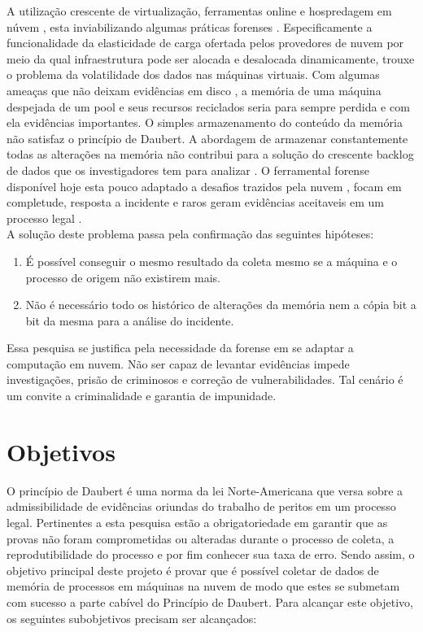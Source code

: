 \documentclass[12pt,				%
	openright,			%
	oneside,			%
	a4paper,			%
	english,			%
	brazil				%
	]{abntex2}
\begin{document}
A utilização crescente de virtualização, ferramentas online e hospredagem em núvem \cite{Amazon2016}, esta inviabilizando algumas práticas forenses \cite{Sharma2012}. 
Especificamente a funcionalidade da elasticidade de carga ofertada pelos provedores de nuvem por meio da qual infraestrutura pode ser alocada e desalocada dinamicamente, 
trouxe o problema da volatilidade dos dados nas máquinas virtuais. Com algumas ameaças que não deixam evidências em disco \cite{Rafique2013}, a memória de uma máquina 
despejada de um pool e seus recursos reciclados seria para sempre perdida e com ela evidências importantes. O simples armazenamento do conteúdo da memória não satisfaz 
o princípio de Daubert. A abordagem de armazenar constantemente todas as alterações na memória não contribui para a solução do crescente backlog de dados que os investigadores 
tem para analizar \cite{Quick2014}. O ferramental forense disponível hoje esta pouco adaptado a desafios trazidos pela nuvem \cite{Dykstra2012a}, focam em completude,
resposta a incidente e raros geram evidências aceitaveis em um processo legal \cite{Reichert2015}. \\

A solução deste problema passa pela confirmação das seguintes hipóteses:

\begin{enumerate}
 \item É possível conseguir o mesmo resultado da coleta mesmo se a máquina e o processo de origem não existirem mais.
 \item Não é necessário todo os histórico de alterações da memória nem a cópia bit a bit da mesma para a análise do incidente.
\end{enumerate}

Essa pesquisa se justifica pela necessidade da forense em se adaptar a computação em nuvem. Não ser capaz de levantar evidências impede investigações, prisão de criminosos e 
correção de vulnerabilidades. Tal cenário é um convite a criminalidade e garantia de impunidade.

\chapter{Objetivos} \label{chap:obj}
O princípio de Daubert é uma norma da lei Norte-Americana que versa sobre a admissibilidade de evidências oriundas do trabalho de peritos em um processo legal. Pertinentes a
esta pesquisa estão a obrigatoriedade em garantir que as provas não foram comprometidas ou alteradas durante o processo de coleta, a reprodutibilidade do processo e
por fim conhecer sua taxa de erro. Sendo assim, o objetivo principal deste projeto é provar que é possível coletar de dados de memória de processos em 
máquinas na nuvem de modo que estes se submetam com sucesso a parte cabível do Princípio de Daubert. Para alcançar este objetivo, os seguintes subobjetivos precisam ser alcançados:
\end{document}
